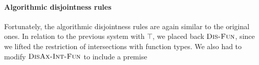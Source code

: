 \paragraph{Algorithmic disjointness rules}

Fortunately, the algorithmic disjointness rules are again similar to the original ones.
In relation to the previous system with $\top$, we placed back $\textsc{Dis-Fun}$, since we lifted the restriction
of intersections with function types.
We also had to modify $\textsc{DisAx-Int-Fun}$ to include a premise  
